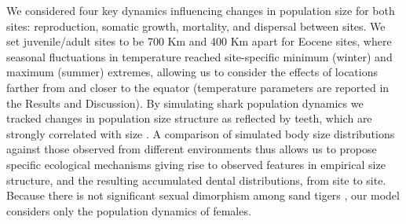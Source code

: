 \documentclass[]{rsos}%
\begin{document}
We considered four key dynamics influencing changes in population size for both sites: reproduction, somatic growth, mortality, and dispersal between sites.
We set juvenile/adult sites to be 700 Km \cite{Kneebone2012, Teter2015} and 400 Km apart for Eocene sites, where seasonal fluctuations in temperature reached site-specific minimum (winter) and maximum (summer) extremes, allowing us to consider the effects of locations farther from and closer to the equator (temperature parameters are reported in the Results and Discussion).
By simulating shark population dynamics we tracked changes in population size structure as reflected by teeth, which are strongly correlated with size \cite{Shimada2002}. 
A comparison of simulated body size distributions against those observed from different environments thus allows us to propose specific ecological mechanisms giving rise to observed features in empirical size structure, and the resulting accumulated dental distributions, from site to site.
Because there is not significant sexual dimorphism among sand tigers \cite{Goldman2006}, our model considers only the population dynamics of females.
\end{document}
